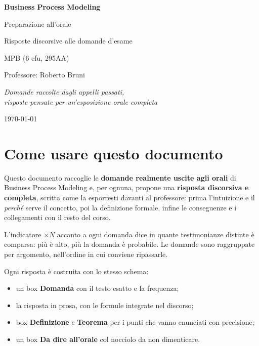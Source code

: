 \documentclass[11pt,a4paper,openany]{book}
\begin{document}
\begin{titlepage}
\centering
\vspace*{3cm}
{\Huge\bfseries\color{inkblue} Business Process Modeling\par}
\vspace{0.6cm}
{\Large\color{accentblue} Preparazione all'orale\par}
\vspace{0.4cm}
{\large Risposte discorsive alle domande d'esame\par}
\vspace{2.2cm}
{\large MPB (6 cfu, 295AA)\par}
\vspace{0.3cm}
{\large Professore: Roberto Bruni\par}
\vspace{3cm}
{\normalsize\itshape Domande raccolte dagli appelli passati,\\ risposte pensate per un'esposizione orale completa\par}
\vfill
{\normalsize \today\par}
\end{titlepage}

\frontmatter

\chapter*{Come usare questo documento}

Questo documento raccoglie le \textbf{domande realmente uscite agli orali} di Business Process Modeling e, per ognuna, propone una \textbf{risposta discorsiva e completa}, scritta come la esporresti davanti al professore: prima l'intuizione e il \emph{perché} serve il concetto, poi la definizione formale, infine le conseguenze e i collegamenti con il resto del corso.

\medskip

L'indicatore \textbf{$\times N$} accanto a ogni domanda dice in quante testimonianze distinte è comparsa: più è alto, più la domanda è probabile. Le domande sono raggruppate per argomento, nell'ordine in cui conviene ripassarle.

\medskip

Ogni risposta è costruita con lo stesso schema:
\begin{itemize}
  \item un box \textcolor{qframe}{\textbf{Domanda}} con il testo esatto e la frequenza;
  \item la risposta in prosa, con le formule integrate nel discorso;
  \item box \textcolor{defframe}{\textbf{Definizione}} e \textcolor{thmframe}{\textbf{Teorema}} per i punti che vanno enunciati con precisione;
  \item un box \textcolor{keyframe}{\textbf{Da dire all'orale}} col nocciolo da non dimenticare.
\end{itemize}
\end{document}
